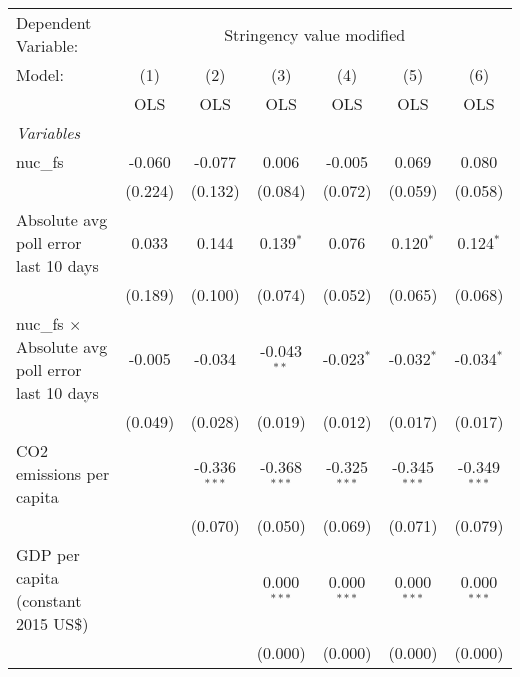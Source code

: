 
\begingroup
\centering
\begin{tabular}{lcccccc}
   \toprule
   Dependent Variable: & \multicolumn{6}{c}{Stringency value modified}\\
   Model:                                                  & (1)     & (2)            & (3)            & (4)            & (5)            & (6)\\  
                                                           &  OLS    & OLS            & OLS            & OLS            & OLS            & OLS\\  
   \midrule
   \emph{Variables}\\
   nuc\_fs                                                 & -0.060  & -0.077         & 0.006          & -0.005         & 0.069          & 0.080\\   
                                                           & (0.224) & (0.132)        & (0.084)        & (0.072)        & (0.059)        & (0.058)\\   
   Absolute avg poll error last 10 days                    & 0.033   & 0.144          & 0.139$^{*}$    & 0.076          & 0.120$^{*}$    & 0.124$^{*}$\\   
                                                           & (0.189) & (0.100)        & (0.074)        & (0.052)        & (0.065)        & (0.068)\\   
   nuc\_fs $\times$ Absolute avg poll error last 10 days   & -0.005  & -0.034         & -0.043$^{**}$  & -0.023$^{*}$   & -0.032$^{*}$   & -0.034$^{*}$\\   
                                                           & (0.049) & (0.028)        & (0.019)        & (0.012)        & (0.017)        & (0.017)\\   
   CO2 emissions per capita                                &         & -0.336$^{***}$ & -0.368$^{***}$ & -0.325$^{***}$ & -0.345$^{***}$ & -0.349$^{***}$\\   
                                                           &         & (0.070)        & (0.050)        & (0.069)        & (0.071)        & (0.079)\\   
   GDP per capita (constant 2015 US\$)                     &         &                & 0.000$^{***}$  & 0.000$^{***}$  & 0.000$^{***}$  & 0.000$^{***}$\\   
                                                           &         &                & (0.000)        & (0.000)        & (0.000)        & (0.000)\\   

\end{tabular}

